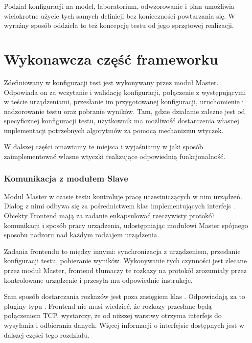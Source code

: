 \documentclass[00-praca-magisterska.tex]{subfiles}
\begin{document}
Podział konfiguracji na model, laboratorium, odwzorowanie i plan umożliwia
wielokrotne użycie tych samych definicji bez konieczności powtarzania się. W
wyraźny sposób oddziela to też koncepcję testu od jego sprzętowej realizacji.

\section{Wykonawcza część frameworku}

Zdefiniowany w konfiguracji test jest wykonywany przez moduł Master. Odpowiada
on za wczytanie i walidację konfiguracji, połączenie z występującymi w teście
urządzeniami, przesłanie im przygotowanej konfiguracji, uruchomienie i
nadzorowanie testu oraz pobranie wyników. Tam, gdzie działanie zależne
jest od specyficznej konfiguracji testu, użytkownik ma możliwość dostarczenia
własnej implementacji potrzebnych algorytmów za pomocą mechanizmu wtyczek.

W dalszej części omawiamy te miejsca i wyjaśniamy w jaki sposób zaimplementować
własne wtyczki realizujące odpowiednią funkcjonalność.

\subsubsection{Komunikacja z modułem Slave}

Moduł Master w czasie testu kontroluje pracę uczestniczących w nim urządzeń.
Dialog z nimi odbywa się za pośrednictwem klas implementujących interfejs
. Obiekty Frontend mają za zadanie enkapsulować rzeczywisty
protokół komunikacji i sposób pracy urządzenia, udostępniając modułowi Master
spójnego sposobu nadzoru nad każdym rodzajem urządzenia.

Zadania frontendu to między innymi: synchronizacja z urządzeniem, przesłanie
konfiguracji testu, pobieranie wyników. Wykonywanie tych czynności jest zlecane
przez moduł Master, frontend tłumaczy te rozkazy na protokół zrozumiały przez
kontrolowane urządzenie i przesyła mu odpowiednie instrukcje.

Sam sposób dostarczania rozkazów jest poza zasięgiem klas .
Odpowiadają za to pluginy typu . Frontend nie musi
wiedzieć, że rozkazy przesłane będą połączeniem TCP, wystarczy, że od niższej
warstwy otrzyma interfejs do wysyłania i odbierania danych. Więcej informacji o
interfejsie  dostępnych jest w dalszej części tego
rozdziału.
\end{document}
